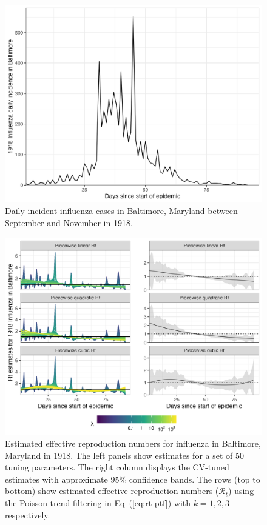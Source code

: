 \documentclass[10pt,letterpaper]{article}
\def\calR{\mathcal{R}}
\renewcommand{\eqref}[1]{Eq~(\ref{#1})}
\begin{document}
\begin{figure}[!ht]
  \centering
  \includegraphics[width=0.8\linewidth]{fig/flu_dat.png}
  \caption{Daily incident influenza cases in Baltimore, Maryland between September 
  and November in 1918.} 
  \label{fig:flu-dat}
\end{figure} 

\begin{figure}[!ht]
  \centering
  \includegraphics[width=0.9\linewidth]{fig/flu_full_res.png}
  \caption{Estimated effective reproduction numbers for influenza in Baltimore,
  Maryland in 1918. The left panels show estimates for a set of 50 tuning
  parameters. The right column displays the CV-tuned estimates with approximate
  95\% confidence bands. The rows (top to bottom) show estimated effective reproduction
  numbers ($\calR_t$) using the Poisson trend filtering in \eqref{eq:rt-ptf}
  with $k=1,2,3$ respectively.} 
  \label{fig:flu-res}
\end{figure} 
\end{document}

